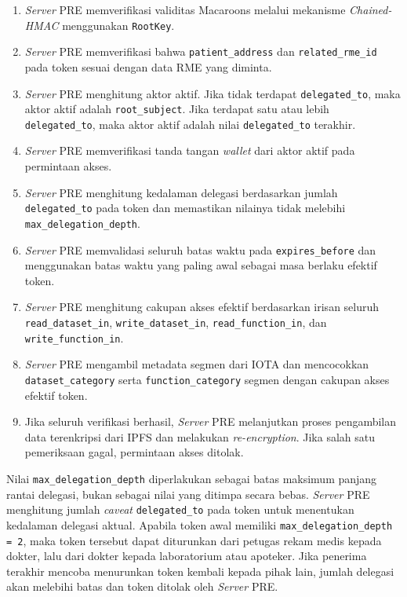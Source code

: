 \begin{enumerate}[leftmargin=*]
	\item \textit{Server} PRE memverifikasi validitas Macaroons melalui mekanisme \textit{Chained-HMAC} menggunakan \texttt{RootKey}.
	\item \textit{Server} PRE memverifikasi bahwa \texttt{patient\_address} dan \texttt{related\_rme\_id} pada token sesuai dengan data RME yang diminta.
	\item \textit{Server} PRE menghitung aktor aktif. Jika tidak terdapat \texttt{delegated\_to}, maka aktor aktif adalah \texttt{root\_subject}. Jika terdapat satu atau lebih \texttt{delegated\_to}, maka aktor aktif adalah nilai \texttt{delegated\_to} terakhir.
	\item \textit{Server} PRE memverifikasi tanda tangan \textit{wallet} dari aktor aktif pada permintaan akses.
	\item \textit{Server} PRE menghitung kedalaman delegasi berdasarkan jumlah \texttt{delegated\_to} pada token dan memastikan nilainya tidak melebihi \texttt{max\_delegation\_depth}.
	\item \textit{Server} PRE memvalidasi seluruh batas waktu pada \texttt{expires\_before} dan menggunakan batas waktu yang paling awal sebagai masa berlaku efektif token.
	\item \textit{Server} PRE menghitung cakupan akses efektif berdasarkan irisan seluruh \texttt{read\_dataset\_in}, \texttt{write\_dataset\_in}, \texttt{read\_function\_in}, dan \texttt{write\_function\_in}.
	\item \textit{Server} PRE mengambil metadata segmen dari IOTA dan mencocokkan \texttt{dataset\_category} serta \texttt{function\_category} segmen dengan cakupan akses efektif token.
	\item Jika seluruh verifikasi berhasil, \textit{Server} PRE melanjutkan proses pengambilan data terenkripsi dari IPFS dan melakukan \textit{re-encryption}. Jika salah satu pemeriksaan gagal, permintaan akses ditolak.
\end{enumerate}

Nilai \texttt{max\_delegation\_depth} diperlakukan sebagai batas maksimum panjang rantai delegasi, bukan sebagai nilai yang ditimpa secara bebas. \textit{Server} PRE menghitung jumlah \textit{caveat} \texttt{delegated\_to} pada token untuk menentukan kedalaman delegasi aktual. Apabila token awal memiliki \texttt{max\_delegation\_depth = 2}, maka token tersebut dapat diturunkan dari petugas rekam medis kepada dokter, lalu dari dokter kepada laboratorium atau apoteker. Jika penerima terakhir mencoba menurunkan token kembali kepada pihak lain, jumlah delegasi akan melebihi batas dan token ditolak oleh \textit{Server} PRE.

